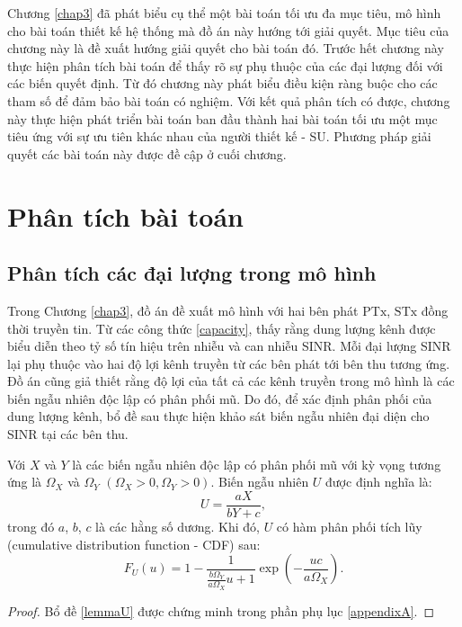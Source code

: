 \documentclass[../main.tex]{subfiles}
\begin{document}
\label{chap4}

Chương \ref{chap3} đã phát biểu cụ thể một bài toán tối ưu đa mục tiêu, mô hình cho bài toán thiết kế hệ thống mà đồ án này hướng tới giải quyết. Mục tiêu của chương này là đề xuất hướng giải quyết cho bài toán đó. Trước hết chương này thực hiện phân tích bài toán để thấy rõ sự phụ thuộc của các đại lượng đối với các biến quyết định. Từ đó chương này phát biểu điều kiện ràng buộc cho các tham số để đảm bảo bài toán có nghiệm. Với kết quả phân tích có được, chương này thực hiện phát triển bài toán ban đầu thành hai bài toán tối ưu một mục tiêu ứng với sự ưu tiên khác nhau của người thiết kế - SU. Phương pháp giải quyết các bài toán này được đề cập ở cuối chương.

\section{Phân tích bài toán}

\subsection{Phân tích các đại lượng trong mô hình}

Trong Chương \ref{chap3}, đồ án đề xuất mô hình với hai bên phát $\text{PTx}$, $\text{STx}$ đồng thời truyền tin. Từ các công thức \eqref{capacity}, thấy rằng dung lượng kênh được biểu diễn theo tỷ số tín hiệu trên nhiễu và can nhiễu SINR. Mỗi đại lượng SINR lại phụ thuộc vào hai độ lợi kênh truyền từ các bên phát tới bên thu tương ứng. Đồ án cũng giả thiết rằng độ lợi của tất cả các kênh truyền trong mô hình là các biến ngẫu nhiên độc lập có phân phối mũ. Do đó, để xác định phân phối của dung lượng kênh, bổ đề sau thực hiện khảo sát biến ngẫu nhiên đại diện cho SINR tại các bên thu.

\begin{lemma}\label{lemmaU}
Với $X$ và $Y$ là các biến ngẫu nhiên độc lập có phân phối mũ với kỳ vọng tương ứng là $\Omega_X$ và $\Omega_Y$ $\left(\Omega_X > 0, \Omega_Y > 0\right)$. Biến ngẫu nhiên $U$ được định nghĩa là:
\begin{equation}\label{lemmaU:U}
    U = \frac{aX}{bY+c},
\end{equation}
trong đó $a$, $b$, $c$ là các hằng số dương. Khi đó, $U$ có hàm phân phối tích lũy (cumulative distribution function - CDF) sau:
\begin{equation}\label{lemmaU:CDF}
    F_U\left(u\right) = 1-\frac{1}{\frac{b\Omega_Y}{a\Omega_X}u + 1}\exp\left(-\frac{uc}{a\Omega_X}\right).
\end{equation}
\end{lemma}
\begin{proof}
Bổ đề \ref{lemmaU} được chứng minh trong phần phụ lục \ref{appendixA}.
\end{proof}
\end{document}
